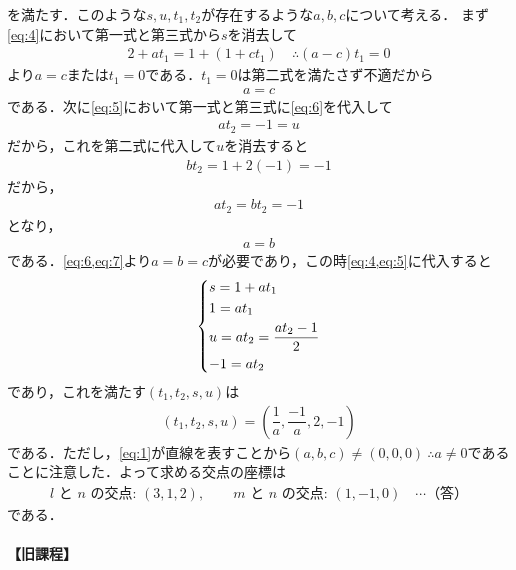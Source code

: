 \documentclass[../../main.tex]{subfiles}
\begin{document}
を満たす．このような$s,u,t_1,t_2$が存在するような$a,b,c$について考える．
まず\cref{eq:4}において第一式と第三式から$s$を消去して
\begin{align}
  2+at_1 = 1 + (1+ct_1) \quad \therefore (a-c)t_1 = 0
\end{align}
より$a=c$または$t_1=0$である．$t_1=0$は第二式を満たさず不適だから
\begin{align}
  a=c \label{eq:6}
\end{align}
である．次に\cref{eq:5}において第一式と第三式に\cref{eq:6}を代入して
\begin{align}
  at_2 = -1 = u
\end{align}
だから，これを第二式に代入して$u$を消去すると
\begin{align}
  bt_2 = 1 + 2(-1) = -1
\end{align}
だから，
\begin{align}
  at_2 = bt_2 = -1
\end{align}
となり，
\begin{align}
  a = b \label{eq:7}
\end{align}
である．\cref{eq:6,eq:7}より$a=b=c$が必要であり，この時\cref{eq:4,eq:5}に代入すると
\begin{align}
  \begin{dcases}
    s = 1+at_1 \\
    1 = at_1 \\
    u = at_2 = \dfrac{at_2-1}{2} \\
    -1 = at_2
  \end{dcases}
\end{align}
であり，これを満たす$(t_1,t_2,s,u)$は
\begin{align}
  (t_1,t_2,s,u) = \left(\dfrac{1}{a},\dfrac{-1}{a},2,-1\right)
\end{align}
である．ただし，\cref{eq:1}が直線を表すことから$(a,b,c)\neq(0,0,0) \ \therefore a\neq 0$であることに注意した．よって求める交点の座標は
\begin{align}
  l \text{ と } n \text{ の交点: } (3, 1, 2), \qquad
  m \text{ と } n \text{ の交点: } (1, -1, 0) \quad \cdots\text{（答）}
\end{align}
である．

\paragraph{【旧課程】}
\end{document}
